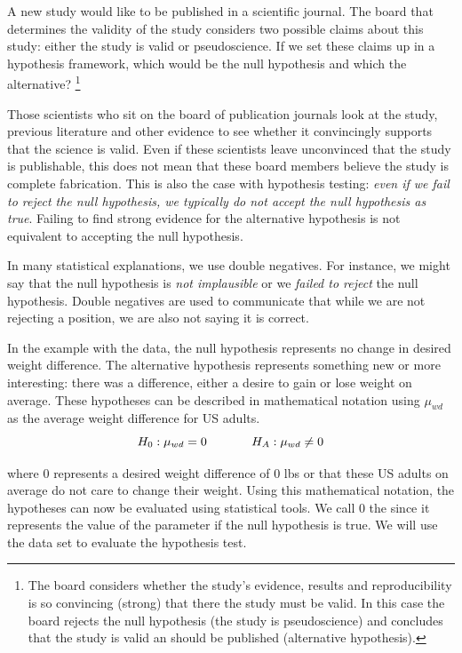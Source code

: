 \begin{exercise} \label{hypTestStudyExample}
A new study would like to be published in a scientific journal. The board that determines the validity of the study considers two possible claims about this study: either the study is valid or pseudoscience. If we set these claims up in a hypothesis framework, which would be the null hypothesis and which the alternative? \footnote{The board considers whether the study's evidence, results and reproducibility is so convincing (strong) that there the study must be valid. In this case the board rejects the null hypothesis (the study is pseudoscience) and concludes that the study is valid an should be published (alternative hypothesis).}
\end{exercise}

Those scientists who sit on the board of publication journals look at the study, previous literature and other evidence to see whether it convincingly supports that the science is valid. Even if these scientists leave unconvinced that the study is publishable, this does not mean that these board members believe the study is complete fabrication. This is also the case with hypothesis testing: \emph{even if we fail to reject the null hypothesis, we typically do not accept the null hypothesis as true}. Failing to find strong evidence for the alternative hypothesis is not equivalent to accepting the null hypothesis.

\begin{tipBox}{
In many statistical explanations, we use double negatives. For instance, we might say that the null hypothesis is \emph{not implausible} or we \emph{failed to reject} the null hypothesis. Double negatives are used to communicate that while we are not rejecting a position, we are also not saying it is correct.}
\end{tipBox}

In the example with the  data, the null hypothesis represents no change in desired weight difference. The alternative hypothesis represents something new or more interesting: there was a difference, either a desire to gain or lose weight on average. These hypotheses can be described in mathematical notation using $\mu_{wd}$ as the average weight difference for US adults. 
\[H_0:\mu_{wd} = 0 \hspace{0.5in} H_A: \mu_{wd} \neq 0\]

where 0 represents a desired weight difference of 0 lbs or that these US adults on average do not care to change their weight. Using this mathematical notation, the hypotheses can now be evaluated using statistical tools. We call 0 the  since it represents the value of the parameter if the null hypothesis is true. We will use the  data set to evaluate the hypothesis test.


